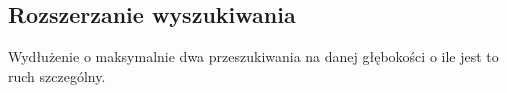 \subsection{Rozszerzanie wyszukiwania}
\label{subsec:rozszerzanie-wyszukiwania}

{
    \color{red}
    \large Wydłużenie o maksymalnie dwa przeszukiwania na danej głębokości o ile jest to ruch szczególny.
}